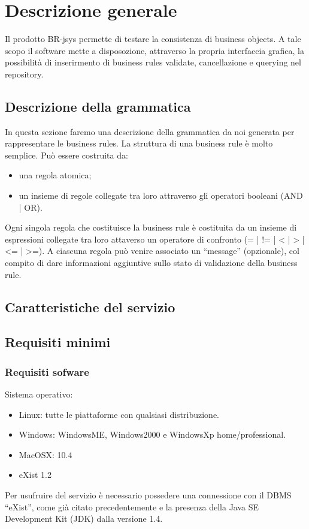 \chapter{Descrizione generale}
Il prodotto BR-jsys permette di testare la consistenza di business objects. A tale scopo il software mette a disposozione, attraverso la propria interfaccia grafica, la possibilità di inserirmento di business rules validate, cancellazione e querying nel repository.

\section{Descrizione della grammatica}
In questa sezione faremo una descrizione della grammatica da noi generata per rappresentare le business rules. La struttura di una business rule \`e molto semplice. Pu\`o essere costruita da:
\begin{itemize}
\item una regola atomica;
\item un insieme di regole collegate tra loro attraverso gli operatori booleani (AND | OR).
\end{itemize}
Ogni singola regola che costituisce la business rule \`e costituita da un insieme di espressioni collegate tra loro attaverso un operatore di confronto (= | != | < | > | <= | >=). A ciascuna regola pu\`o venire associato un ``message'' (opzionale), col compito di dare informazioni aggiuntive sullo stato di validazione della business rule.
\section{Caratteristiche del servizio}

\section{Requisiti minimi}
\subsection{Requisiti sofware}
Sistema operativo:
\begin{itemize}
\item Linux: tutte le piattaforme con qualsiasi distribuzione.
\item Windows: WindowsME, Windows2000 e WindowsXp home/professional.
\item MacOSX: 10.4
\item eXist 1.2
\end{itemize}
Per usufruire del servizio \`e necessario possedere una connessione con il DBMS ``eXist'', come gi\`a citato precedentemente e la presenza della Java SE Development Kit (JDK) dalla versione 1.4.
